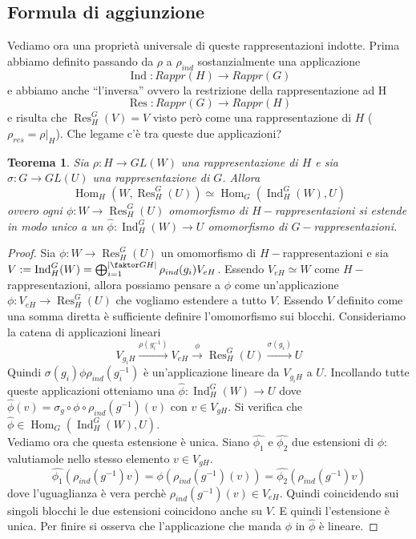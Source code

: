 \documentclass[11pt]{article}
\theoremstyle{plain}
\newtheorem{thm}{Teorema}[section]
\theoremstyle{definition}
\theoremstyle{remark}
\DeclareMathOperator{\Hom}{Hom}
\DeclareMathOperator{\Ind}{Ind}
\DeclareMathOperator{\Res}{Res}
\DeclareMathOperator{\iso}{\simeq}
\begin{document}
\subsection{Formula di aggiunzione}
Vediamo ora una proprietà universale di queste rappresentazioni indotte. Prima abbiamo definito passando da $\rho$ a $\rho_{ind}$ sostanzialmente una applicazione
\[\Ind:Rappr(H)\rightarrow Rappr(G)\]
e abbiamo anche ``l'inversa'' ovvero la restrizione della rappresentazione ad H
\[\Res:Rappr(G)\rightarrow Rappr(H)\]
e risulta che $\Res_H^G(V)=V$ visto però come una rappresentazione di $H$ ($\rho_{res}=\rho|_H$). Che legame c'è tra queste due applicazioni?
\begin{thm}
Sia $\rho:H\rightarrow GL(W)$ una rappresentazione di $H$ e sia $\sigma:G\rightarrow GL(U)$ una rappresentazione di $G$. Allora
\[\Hom_H(W,\Res_H^G(U))\iso \Hom_G(\Ind_H^G(W),U)\]
ovvero ogni $\phi:W\rightarrow \Res_H^G(U)$ omomorfismo di $H-$rappresentazioni si estende in modo unico a un $\hat{\phi}:\Ind_H^G(W)\rightarrow U$ omomorfismo di $G-$rappresentazioni.
\end{thm}
\begin{proof} Sia $\phi:W\rightarrow \Res_H^G(U)$ un omomorfismo di $H-$rappresentazioni e sia $V:=\Ind_H^G(W)=\bigoplus_{i=1}^{|\faktor GH|} \rho_{ind}(g_i)V_{eH}$. Essendo $V_{eH}\iso W$ come $H-$rappresentazioni, allora possiamo pensare a $\phi$ come un'applicazione $\phi:V_{eH}\rightarrow \Res_H^G(U)$ che vogliamo estendere a tutto $V$. Essendo $V$ definito come una somma diretta è sufficiente definire l'omomorfismo sui blocchi.
Consideriamo la catena di applicazioni lineari
\[V_{g_iH}\overset{\rho(g_i^{-1})}{\longrightarrow} V_{eH}\overset{\phi}{\longrightarrow} \Res_H^G(U)\overset{\sigma(g_i)}{\longrightarrow} U\]
Quindi $\sigma(g_i)\phi\rho_{ind}(g_i^{-1})$ è un'applicazione lineare da $V_{g_iH}$ a $U$.\newline
Incollando tutte queste applicazioni otteniamo una $\hat{\phi}:\Ind_H^G(W)\rightarrow U$ dove
$\hat{\phi}(v)=\sigma_{g}\circ \phi\circ \rho_{ind}(g^{-1})(v)$ con $v\in V_{gH}$. Si verifica che $\hat{\phi}\in \Hom_G(\Ind_H^G(W),U)$. \\
Vediamo ora che questa estensione è unica. Siano $\hat{\phi_1}$ e $\hat{\phi_2}$ due estensioni di $\phi$: valutiamole nello stesso elemento $v\in V_{gH}$.
\[\hat{\phi_1}(\rho_{ind}(g^{-1})v)=\phi(\rho_{ind}(g^{-1})(v))=\hat{\phi_2}(\rho_{ind}(g^{-1})v)\]
dove l'uguaglianza è vera perchè $\rho_{ind}(g^{-1})(v)\in V_{eH}$. Quindi coincidendo sui singoli blocchi le due estensioni coincidono anche su $V$. E quindi l'estensione è unica.
Per finire si osserva che l'applicazione che manda $\phi$ in $\hat\phi$ è lineare.
\end{proof}
\end{document}
